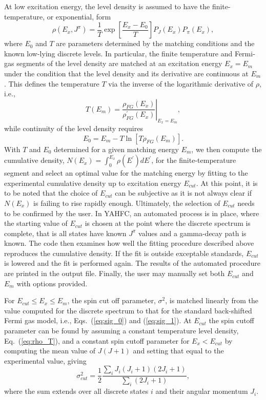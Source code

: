 \documentclass[
10pt,
showpacs,preprintnumbers,footinbib,
amsfonts,amsmath,amssymb,
aps,
prc,twocolumn,groupedaddress,superscriptaddress,
showkeys,
nofootinbib
]{revtex4-1}
\begin{document}
At low excitation energy, the level density is assumed to have the finite-temperature, or exponential, form
\begin{equation}
\rho(E_x,J^\pi) = \frac{1}{T}\exp\left [ \frac{E_x - E_0}{T}\right ] P_J(E_x) P_\pi(E_x),
\label{eq:rho_T}
\end{equation}
where $E_0$ and $T$ are parameters determined by the matching conditions and the known low-lying discrete levels. In particular, the finite temperature and Fermi-gas segments of the level density are matched at an excitation energy $E_x=E_m$ under the condition that the level density and its derivative are continuous at $E_m$. This defines the temperature $T$ via the inverse of the logarithmic derivative of $\rho$, i.e.,
\begin{equation}
T(E_m) = \left. \frac{\rho_{FG}(E_x)}{\rho^\prime_{FG}(E_x)} \right |_{E_x = E_m},
\end{equation}
while continuity of the level density requires
\begin{equation}
E_0 = E_m -T\ln\left [ T\rho_{FG}(E_m)\right].
\end{equation}
With $T$ and $E_0$ determined for a given matching energy $E_m$, we then compute the cumulative density, $N(E_x) = \int_0^{E_x} \rho(E^\prime)dE^\prime$, for the finite-temperature segment and select an optimal value for the matching energy by fitting to the experimental cumulative density up to excitation energy $E_{cut}$. At this point, it is to be noted that the choice of $E_{cut}$ can be subjective as it is not always clear if $N(E_x)$ is failing to rise rapidly enough. Ultimately, the selection of $E_{cut}$ needs to be confirmed by the user. In YAHFC, an automated process is in place, where the starting value of $E_{cut}$ is chosen at the point where the discrete spectrum is complete, that is all states have known $J^\pi$ values and a gamma-decay path is known. The code then examines how well the fitting procedure described above reproduces the cumulative density. If the fit is outside exceptable standards, $E_{cut}$ is lowered and the fit is performed again. The results of the automated procedure are printed in the output file. Finally, the user may manually set both $E_{cut}$ and $E_m$ with options provided.

For $E_{cut} \le E_x \le E_m$, the spin cut off parameter, $\sigma^2$, is matched linearly from the value computed for the discrete spectrum to that for the standard back-shifted Fermi gas model, i.e., Eqs.~(\ref{eq:sig_0}) and (\ref{eq:sig_1}). At $E_{cut}$ the spin cutoff parameter can be found by assuming a constant temperature level density, Eq.~(\ref{eq:rho_T}), and a constant spin cutoff parameter for $E_x < E_{cut}$ by computing the mean value of $J(J+1)$ and setting that equal to the experimental value, giving
\begin{equation}
\sigma^2_{cut} = \frac{1}{2}\frac{\sum_i J_i(J_i+1)(2J_i+1)}{\sum_i (2J_i+1)},
\end{equation}
where the sum extends over all discrete states $i$ and their angular momentum $J_i$.
\end{document}
